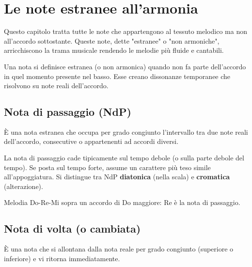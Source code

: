 \chapter{Le note estranee all'armonia}
\label{chap:noteestranee}

Questo capitolo tratta tutte le note che appartengono al tessuto melodico ma non all'accordo sottostante. Queste note, dette "estranee" o "non armoniche", arricchiscono la trama musicale rendendo le melodie più fluide e cantabili.

\begin{definizione}
    \label{def:nota_estranea}
    Una nota si definisce estranea (o non armonica) quando non fa parte dell'accordo in quel momento presente nel basso. Esse creano dissonanze temporanee che risolvono su note reali dell'accordo.
\end{definizione}

\section{Nota di passaggio (NdP)}
\label{sec:nota_passaggio}

\begin{definizione}
    È una nota estranea che occupa per grado congiunto l'intervallo tra due note reali dell'accordo, consecutive o appartenenti ad accordi diversi.
\end{definizione}

\begin{regola}
    La nota di passaggio cade tipicamente sul tempo debole (o sulla parte debole del tempo). Se posta sul tempo forte, assume un carattere più teso simile all'appoggiatura. Si distingue tra NdP \textbf{diatonica} (nella scala) e \textbf{cromatica} (alterazione).
\end{regola}

\begin{esempio}
    Melodia Do-Re-Mi sopra un accordo di Do maggiore: Re è la nota di passaggio.
\end{esempio}

\section{Nota di volta (o cambiata)}
\label{sec:nota_volta}

\begin{definizione}
    È una nota che si allontana dalla nota reale per grado congiunto (superiore o inferiore) e vi ritorna immediatamente.
\end{definizione}

